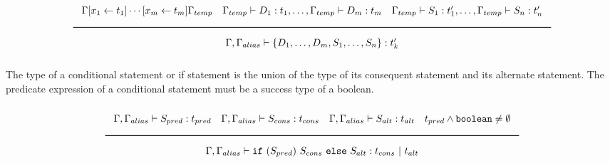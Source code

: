 \noindent
\[
  \Rule{\Gamma [x_1 \leftarrow t_1] \cdots [x_m \leftarrow t_m] \Gamma_{temp} \quad
    \Gamma_{temp} \vdash D_1 : t_1, \ldots, \Gamma_{temp} \vdash D_m : t_m \quad
    \Gamma_{temp} \vdash S_1 : t'_1, \ldots, \Gamma_{temp} \vdash S_n : t'_n
    }{\Gamma, \Gamma_{alias} \vdash \{ D_1, \ldots, D_m, S_1, \ldots, S_n\} : t'_k}
\]
\noindent

The type of a conditional statement or if statement is the union of the type of its consequent statement and its alternate statement.
The predicate expression of a conditional statement must be a success type of a boolean.

\noindent
\[
  \Rule{\Gamma, \Gamma_{alias} \vdash S_{pred} : t_{pred} \quad \Gamma, \Gamma_{alias} \vdash S_{cons} : t_{cons} \quad \Gamma, \Gamma_{alias} \vdash S_{alt} : t_{alt}
    \quad t_{pred} \wedge \Bool \neq \emptyset}{\Gamma, \Gamma_{alias} \vdash \texttt{if}\ (S_{pred})\ S_{cons}\
    \texttt{else}\ S_{alt} : t_{cons}\ |\ t_{alt}}
\]
\noindent
